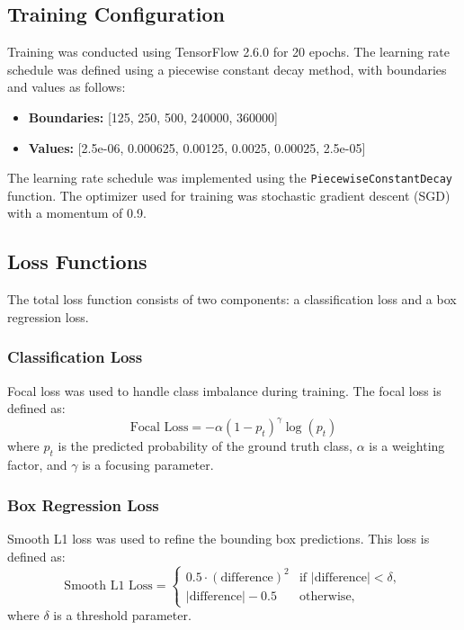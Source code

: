 \documentclass[10pt,twocolumn,letterpaper]{article}
\begin{document}
\subsection{Training Configuration}
Training was conducted using TensorFlow 2.6.0 for 20 epochs. The learning rate schedule was defined using a piecewise constant decay method, with boundaries and values as follows:
\begin{itemize}
    \item \textbf{Boundaries:} [125, 250, 500, 240000, 360000]
    \item \textbf{Values:} [2.5e-06, 0.000625, 0.00125, 0.0025, 0.00025, 2.5e-05]
\end{itemize}

The learning rate schedule was implemented using the \texttt{PiecewiseConstantDecay} function. The optimizer used for training was stochastic gradient descent (SGD) with a momentum of 0.9.

\subsection{Loss Functions}
The total loss function consists of two components: a classification loss and a box regression loss.

\subsubsection{Classification Loss}
Focal loss was used to handle class imbalance during training. The focal loss is defined as:
\begin{equation}
\text{Focal Loss} = -\alpha (1 - p_t)^\gamma \log(p_t)
\end{equation}
where $p_t$ is the predicted probability of the ground truth class, $\alpha$ is a weighting factor, and $\gamma$ is a focusing parameter.

\subsubsection{Box Regression Loss}
Smooth L1 loss was used to refine the bounding box predictions. This loss is defined as:
\begin{equation}
\text{Smooth L1 Loss} =
\begin{cases} 
0.5 \cdot (\text{difference})^2 & \text{if } |\text{difference}| < \delta, \\
|\text{difference}| - 0.5 & \text{otherwise},
\end{cases}
\end{equation}
where $\delta$ is a threshold parameter.
\end{document}
